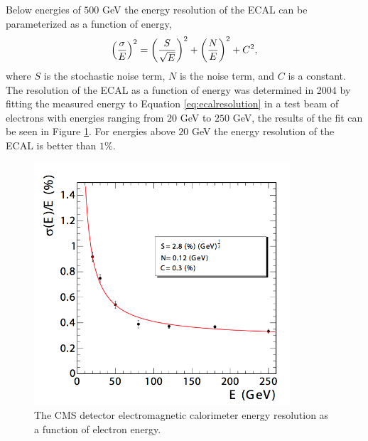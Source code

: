 
Below energies of $500$ GeV the energy resolution of the ECAL can be parameterized as a function of energy,
\begin{equation}
\label{eq:ecalresolution}
\left({\sigma \over E}\right)^{2} = \left({S \over \sqrt{E}}\right)^{2} + \left({N \over E}\right)^{2} + C^{2},
\end{equation}
where $S$ is the stochastic noise term, $N$ is the noise term, and $C$ is a constant.
The resolution of the ECAL as a function of energy was determined in 2004 by fitting the measured energy to Equation \ref{eq:ecalresolution} in a test beam of electrons with energies ranging from $20$ GeV to $250$ GeV, the results of the fit can be seen in Figure \ref{fig:ecalres}.
For energies above $20$ GeV the energy resolution of the ECAL is better than $1\%$\cite{CMS_DETECTOR}.
\begin{figure}[htpb]
\begin{center}
\includegraphics[width=0.85\textwidth]{plots/ecalres.png}
\caption{The CMS detector electromagnetic calorimeter energy resolution as a function of electron energy\cite{CMS_DETECTOR}.}
\label{fig:ecalres}
\end{center}
\end{figure}
